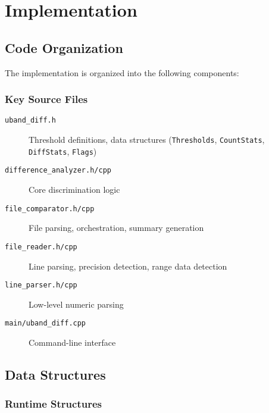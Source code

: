 \section{Implementation}
\label{sec:implementation}

\subsection{Code Organization}

The \ubdiff{} implementation is organized into the following components:

\subsubsection{Key Source Files}

\begin{description}
    \item[\texttt{uband\_diff.h}] Threshold definitions, data structures (\texttt{Thresholds}, \texttt{CountStats}, \texttt{DiffStats}, \texttt{Flags})
    \item[\texttt{difference\_analyzer.h/cpp}] Core discrimination logic
    \item[\texttt{file\_comparator.h/cpp}] File parsing, orchestration, summary generation
    \item[\texttt{file\_reader.h/cpp}] Line parsing, precision detection, range data detection
    \item[\texttt{line\_parser.h/cpp}] Low-level numeric parsing
    \item[\texttt{main/uband\_diff.cpp}] Command-line interface
\end{description}

\subsection{Data Structures}

\subsubsection{Runtime Structures}

